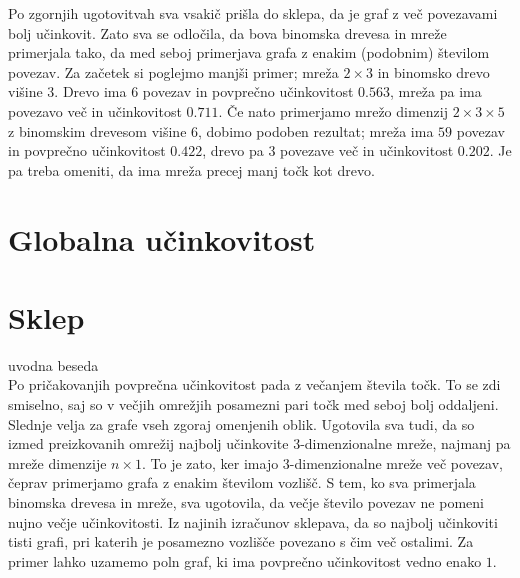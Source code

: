 \documentclass[a4paper, 16pt]{article}
\begin{document}
    Po zgornjih ugotovitvah sva vsakič prišla do sklepa, da je graf z več povezavami bolj učinkovit. Zato sva se odločila, da bova binomska drevesa
    in mreže primerjala tako, da med seboj primerjava grafa z enakim (podobnim) številom povezav. Za začetek si poglejmo manjši primer; mreža 
    $2 \times 3$ in binomsko drevo višine $3$. Drevo ima $6$ povezav in povprečno učinkovitost $0.563$, mreža pa ima povezavo več in učinkovitost $0.711$.
    Če nato primerjamo mrežo dimenzij $2 \times 3 \times 5$ z binomskim drevesom višine $6$, dobimo podoben rezultat; mreža ima $59$ povezav in 
    povprečno učinkovitost $0.422$, drevo pa $3$ povezave več in učinkovitost $0.202$. Je pa treba omeniti, da ima mreža precej manj točk kot drevo.
    


\section{Globalna učinkovitost}

\section{Sklep}
uvodna beseda\\
Po pričakovanjih povprečna učinkovitost pada z večanjem števila točk.
To se zdi smiselno, saj so v večjih omrežjih posamezni pari točk med seboj bolj oddaljeni.
Slednje velja za grafe vseh zgoraj omenjenih oblik. 
Ugotovila sva tudi, da so izmed preizkovanih omrežij najbolj učinkovite 3-dimenzionalne mreže, 
najmanj pa mreže dimenzije $n \times 1$. To je zato, ker imajo 3-dimenzionalne mreže več povezav, čeprav primerjamo grafa z enakim številom vozlišč.
S tem, ko sva primerjala binomska drevesa in mreže, sva ugotovila, da večje število povezav ne pomeni nujno večje učinkovitosti. 
Iz najinih izračunov sklepava, da so najbolj učinkoviti tisti grafi, pri katerih je posamezno vozlišče povezano s čim več ostalimi. 
Za primer lahko uzamemo poln graf, ki ima povprečno učinkovitost vedno enako $1$.
\end{document}
